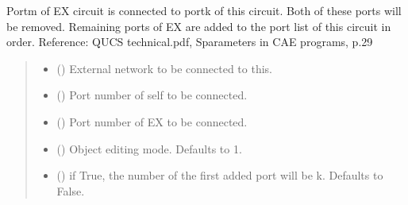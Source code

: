 \documentclass[letterpaper,10pt,english]{sphinxmanual}
\begin{document}
\begin{fulllineitems}
\begin{fulllineitems}
\label{\detokenize{touchstone:touchstone.spfile.connect_network_1_conn}}
\pysigstartsignatures
{}
\pysigstopsignatures
\sphinxAtStartPar
Port\sphinxhyphen{}m of EX circuit is connected to port\sphinxhyphen{}k of this circuit. Both of these ports will be removed.
Remaining ports of EX are added to the port list of this circuit in order.
Reference: QUCS technical.pdf, S\sphinxhyphen{}parameters in CAE programs, p.29
\begin{quote}\begin{description}
\begin{itemize}
\item {}
\sphinxAtStartPar
{} ({\hyperref[\detokenize{touchstone:touchstone.spfile}]{}}) \textendash{} External network to be connected to this.

\item {}
\sphinxAtStartPar
{} () \textendash{} Port number of self to be connected.

\item {}
\sphinxAtStartPar
{} () \textendash{} Port number of EX to be connected.

\item {}
\sphinxAtStartPar
{} (\sphinxstyleliteralemphasis{\sphinxupquote{, }}) \textendash{} Object editing mode. Defaults to \sphinxhyphen{}1.

\item {}
\sphinxAtStartPar
{} (\sphinxstyleliteralemphasis{\sphinxupquote{, }}) \textendash{} if True, the number of the first added port will be k. Defaults to False.


\end{itemize}
\end{description}
\end{quote}
\end{fulllineitems}
\end{fulllineitems}
\end{document}
